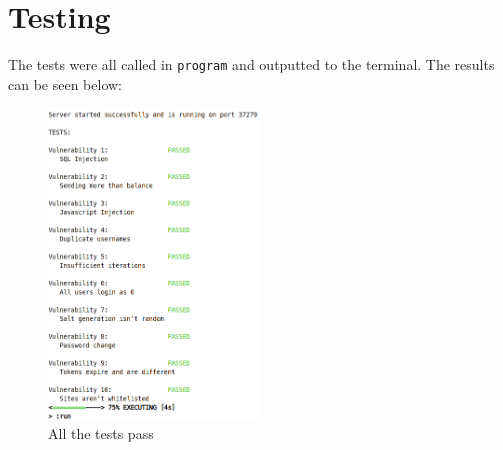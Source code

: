 \documentclass[a4paper,fleqn,twoside,11pt]{article}
\begin{document}


\pagestyle{plain}











\section{Testing}
The tests were all called in \verb|program| and outputted to the terminal. The results can be seen below:
\begin{figure}[h]
	\centering
	\includegraphics[width=0.5\textwidth]{figs/pass.png}
	\caption{All the tests pass}
	\label{figvun6a}
  \end{figure}\\


\end{document}
